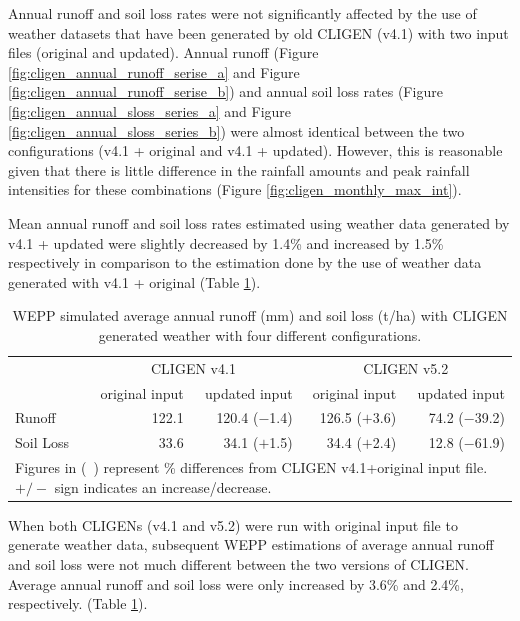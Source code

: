 Annual runoff and soil loss rates were not significantly affected by the use of
weather datasets that have been generated by old CLIGEN (v4.1) with two input
files (original and updated). Annual runoff (Figure
\ref{fig:cligen_annual_runoff_serise_a} and Figure
\ref{fig:cligen_annual_runoff_serise_b}) and annual soil loss rates (Figure
\ref{fig:cligen_annual_sloss_series_a} and Figure
\ref{fig:cligen_annual_sloss_series_b}) were almost identical between the two
configurations (v4.1 + original and v4.1 + updated). However, this is reasonable
given that there is little difference in the rainfall amounts and peak rainfall
intensities for these combinations (Figure \ref{fig:cligen_monthly_max_int}).

Mean annual runoff and soil
loss rates estimated using weather data generated by v4.1 + updated were
slightly decreased by 1.4\% and increased by 1.5\% respectively in comparison to
the estimation done by the use of weather data generated with v4.1 + original
(Table \ref{tab:SimualtedAnnualRunoffAndSoilLossWithDifferentConfiguration}).

\begin{table}[htbp]
  \centering
  \caption[WEPP simulated average annual runoff and soil loss]{WEPP
simulated average annual runoff (mm) and soil loss (t/ha) with CLIGEN generated
weather with four different configurations.}
  \label{tab:SimualtedAnnualRunoffAndSoilLossWithDifferentConfiguration}
    \begin{tabular}{lrrrr}
      \toprule
       & \multicolumn{2}{c}{CLIGEN v4.1} &
\multicolumn{2}{c}{CLIGEN v5.2}\\
      \cmidrule(r){2-3}\cmidrule(l){4-5}
       & original input & updated input & original input &
updated input \\
      \midrule
      Runoff & 122.1 & 120.4 ($-$1.4) & 126.5 ($+$3.6) & 74.2 ($-$39.2)\\
      Soil Loss & 33.6 & 34.1 ($+$1.5) & 34.4 ($+$2.4) & 12.8 ($-$61.9)\\
      \bottomrule
      \multicolumn{5}{p{10.5cm}}{\footnotesize Figures in (\ )
represent \% differences from CLIGEN v4.1+original input file. $+/-$ sign
indicates an increase/decrease.}
    \end{tabular}
\end{table}

When both CLIGENs (v4.1 and v5.2) were run with original input file to generate
weather data, subsequent WEPP estimations of average annual runoff and soil loss
were not much different between the two versions of CLIGEN. Average annual
runoff and soil loss were only increased by 3.6\% and 2.4\%, respectively.
(Table \ref{tab:SimualtedAnnualRunoffAndSoilLossWithDifferentConfiguration}).

